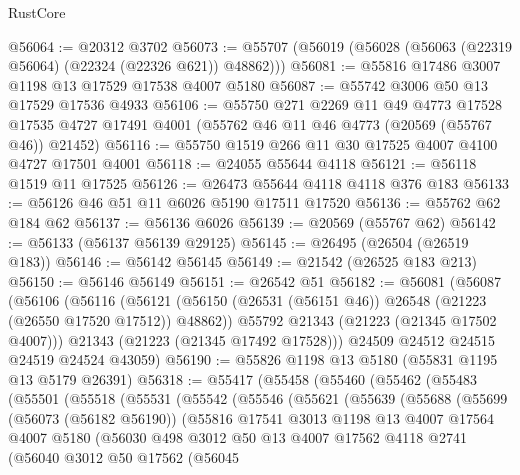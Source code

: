 \begin{lexlean}{RustCore}
\begin{coremodule}
@56064 := @20312 @3702
@56073 := @55707 (@56019 (@56028 (@56063 (@22319 @56064) (@22324 (@22326 @621)) @48862)))
@56081 := @55816 @17486 @3007 @1198 @13 @17529 @17538 @4007 @5180
@56087 := @55742 @3006 @50 @13 @17529 @17536 @4933
@56106 := @55750
    @271
    @2269
    @11
    @49
    @4773
    @17528
    @17535
    @4727
    @17491
    @4001
    (@55762 @46 @11 @46 @4773 (@20569 (@55767 @46)) @21452)
@56116 := @55750 @1519 @266 @11 @30 @17525 @4007 @4100 @4727 @17501 @4001
@56118 := @24055 @55644 @4118
@56121 := @56118 @1519 @11 @17525
@56126 := @26473 @55644 @4118 @4118 @376 @183
@56133 := @56126 @46 @51 @11 @6026 @5190 @17511 @17520
@56136 := @55762 @62 @184 @62
@56137 := @56136 @6026
@56139 := @20569 (@55767 @62)
@56142 := @56133 (@56137 @56139 @29125)
@56145 := @26495 (@26504 (@26519 @183))
@56146 := @56142 @56145
@56149 := @21542 (@26525 @183 @213)
@56150 := @56146 @56149
@56151 := @26542 @51
@56182 := @56081
    (@56087
      (@56106
        (@56116
          (@56121 (@56150 (@26531 (@56151 @46)) @26548 (@21223 (@26550 @17520 @17512)) @48862))
          @55792
          @21343
          (@21223 (@21345 @17502 @4007)))
        @21343
        (@21223 (@21345 @17492 @17528)))
      @24509
      @24512
      @24515
      @24519
      @24524
      @43059)
@56190 := @55826 @1198 @13 @5180 (@55831 @1195 @13 @5179 @26391)
@56318 := @55417
    (@55458
      (@55460
        (@55462
          (@55483
            (@55501
              (@55518
                (@55531
                  (@55542
                    (@55546
                      (@55621
                        (@55639
                          (@55688
                            (@55699
                              (@56073 (@56182 @56190))
                              (@55816
                                @17541
                                @3013
                                @1198
                                @13
                                @4007
                                @17564
                                @4007
                                @5180
                                (@56030
                                  @498
                                  @3012
                                  @50
                                  @13
                                  @4007
                                  @17562
                                  @4118
                                  @2741
                                  (@56040
                                    @3012
                                    @50
                                    @17562
                                    (@56045

\end{coremodule}
\end{lexlean}
